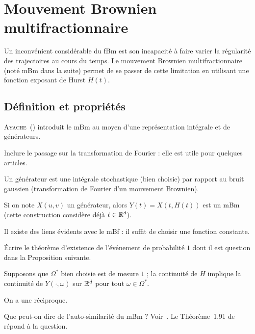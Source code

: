 \section{Mouvement Brownien multifractionnaire}
Un inconvénient considérable du fBm est son incapacité à faire varier
la régularité des trajectoires au cours du temps. Le mouvement
Brownien multifractionnaire (noté mBm dans la suite) permet de se
passer de cette limitation en utilisant une fonction exposant de Hurst
$H(t)$.

\subsection{Définition et propriétés}
\textsc{Ayache}~(\cite{ayache2018}) introduit le mBm au moyen d'une
représentation intégrale et de générateurs.

\begin{prerequis}
  Inclure le passage sur la transformation de Fourier : elle est utile
  pour quelques articles.
\end{prerequis}

Un générateur est une intégrale stochastique (bien choisie) par
rapport au bruit gaussien (transformation de Fourier d'un mouvement
Brownien).

Si on note $X(u,v)$ un générateur, alors $Y(t) = X(t, H(t))$ est un
mBm (cette construction considère déjà $t\in\mathbb{R}^d$).

Il existe des liens évidents avec le mBf : il suffit de choisir une
fonction constante.

\begin{alert}
  Écrire le théorème d'existence de l'événement de probabilité $1$
  dont il est question dans la Proposition suivante.
\end{alert}

\begin{proposition}
  Supposons que $\Omega^*$ bien choisie est de mesure $1$ ; la
  continuité de $H$ implique la continuité de $Y(\cdot,\omega)$ sur
  $\mathbb{R}^d$ pour tout $\omega\in\Omega^*$.
  \begin{alert}
    On a une réciproque.
  \end{alert}
\end{proposition}

\begin{question}
  Que peut-on dire de l'auto-similarité du mBm ?
  Voir~\cite[Définitions~(1.69) et~(1.70)]{ayache2018}. Le
  Théorème~1.91 de~\cite{ayache2018} répond à la question.
\end{question}

